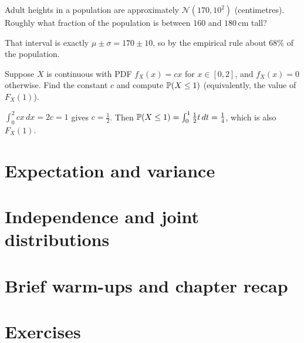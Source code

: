 \begin{warmup}[\coffee{2}]
Adult heights in a population are approximately $\mathcal{N}(170, 10^2)$ (centimetres). Roughly what fraction of the population is between $160$ and $180$\,cm tall?
\end{warmup}
\begin{warmupSolution}
That interval is exactly $\mu \pm \sigma = 170 \pm 10$, so by the empirical rule about $68\%$ of the population.
\end{warmupSolution}

\begin{warmup}[\coffee{2}]
Suppose $X$ is continuous with PDF $f_X(x) = c x$ for $x \in [0, 2]$, and $f_X(x) = 0$ otherwise. Find the constant $c$ and compute $\mathbb{P}(X \le 1)$ (equivalently, the value of $F_X(1)$).
\end{warmup}
\begin{warmupSolution}
$\int_0^2 c x \, dx = 2c = 1$ gives $c = \tfrac{1}{2}$. Then $\mathbb{P}(X \le 1) = \int_0^1 \tfrac{1}{2} t \, dt = \tfrac{1}{4}$, which is also $F_X(1)$.
\end{warmupSolution}

\bigskip


\section{Expectation and variance}
\label{sec:expectation}

\section{Independence and joint distributions}

\section{Brief warm-ups and chapter recap}


\section*{Exercises}
